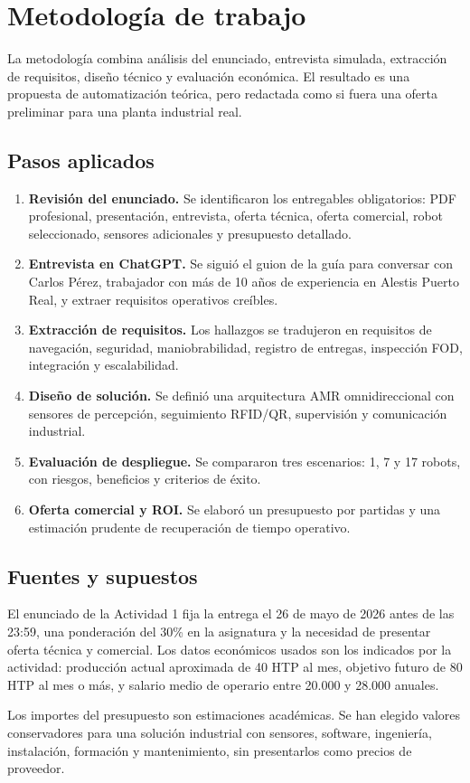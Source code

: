 \chapter{Metodología de trabajo}

La metodología combina análisis del enunciado, entrevista simulada, extracción de requisitos, diseño técnico y evaluación económica. El resultado es una propuesta de automatización teórica, pero redactada como si fuera una oferta preliminar para una planta industrial real.

\section{Pasos aplicados}

\begin{enumerate}
  \item \textbf{Revisión del enunciado.} Se identificaron los entregables obligatorios: PDF profesional, presentación, entrevista, oferta técnica, oferta comercial, robot seleccionado, sensores adicionales y presupuesto detallado.
  \item \textbf{Entrevista en ChatGPT.} Se siguió el guion de la guía para conversar con Carlos Pérez, trabajador con más de 10 años de experiencia en Alestis Puerto Real, y extraer requisitos operativos creíbles.
  \item \textbf{Extracción de requisitos.} Los hallazgos se tradujeron en requisitos de navegación, seguridad, maniobrabilidad, registro de entregas, inspección FOD, integración y escalabilidad.
  \item \textbf{Diseño de solución.} Se definió una arquitectura AMR omnidireccional con sensores de percepción, seguimiento RFID/QR, supervisión y comunicación industrial.
  \item \textbf{Evaluación de despliegue.} Se compararon tres escenarios: 1, 7 y 17 robots, con riesgos, beneficios y criterios de éxito.
  \item \textbf{Oferta comercial y ROI.} Se elaboró un presupuesto por partidas y una estimación prudente de recuperación de tiempo operativo.
\end{enumerate}

\section{Fuentes y supuestos}

El enunciado de la Actividad 1 fija la entrega el 26 de mayo de 2026 antes de las 23:59, una ponderación del 30\% en la asignatura y la necesidad de presentar oferta técnica y comercial. Los datos económicos usados son los indicados por la actividad: producción actual aproximada de 40 HTP al mes, objetivo futuro de 80 HTP al mes o más, y salario medio de operario entre 20.000 y 28.000 \texteuro{} anuales.

Los importes del presupuesto son estimaciones académicas. Se han elegido valores conservadores para una solución industrial con sensores, software, ingeniería, instalación, formación y mantenimiento, sin presentarlos como precios de proveedor.
